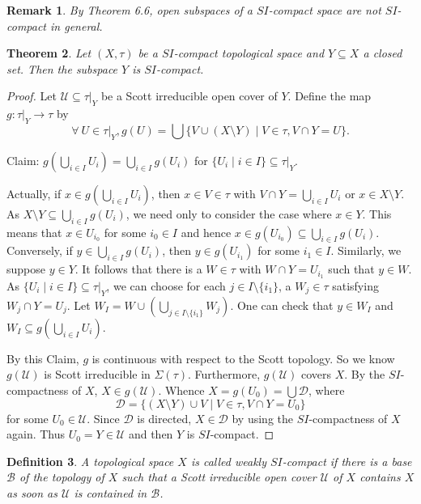 \documentclass[preprint,12pt]{elsarticle}
\numberwithin{equation}{section}
\newtheorem{theorem}{Theorem}[section]
\newtheorem{definition}[theorem]{Definition}
\newtheorem{remark}[theorem]{Remark}
\begin{document}
\begin{remark}{\rm By Theorem 6.6,  open subspaces of a $SI$-compact space are not $SI$-compact in general.}
\end{remark}

\begin{theorem} Let $(X,\tau)$ be a $SI$-compact topological space and $Y\subseteq X$ a closed set. Then the subspace $Y$ is $SI$-compact.
\end{theorem}
\begin{proof}Let $\mathcal{U}\subseteq \tau|_{Y}$ be a Scott irreducible open cover of $Y$. Define the map $g:\tau|_{Y}\longrightarrow \tau$ by $$\forall\ U\in\tau|_{Y}, g(U)=\bigcup\{V\cup (X\setminus Y)\mid V\in\tau, V\cap Y=U\}.$$

Claim: $g(\bigcup\limits_{i\in I}U_{i})=\bigcup\limits_{i\in I}g(U_{i})$ for $\{U_{i}\mid i\in I\}\subseteq\tau|_{Y}$.

 Actually, if $x\in g(\bigcup\limits_{i\in I}U_{i})$, then $x\in V\in\tau$ with $V\cap Y=\bigcup\limits_{i\in I}U_{i}$ or $x\in X\setminus Y$. As $X\setminus Y\subseteq\bigcup\limits_{i\in I}g(U_{i})$, we need only to consider the case where $x\in Y$. This means that $x\in U_{i_{0}}$ for some $i_{0}\in I$ and hence $x\in g(U_{i_{0}})\subseteq\bigcup\limits_{i\in I}g(U_{i})$. Conversely, if $y\in\bigcup\limits_{i\in I}g(U_{i})$, then $y\in g(U_{i_{1}})$ for some $i_{1}\in I$. Similarly, we suppose $y\in Y$. It follows that there is a $W\in\tau$ with $W\cap Y=U_{i_{1}}$ such that $y\in W$. As $\{U_{i}\mid i\in I\}\subseteq\tau|_{Y}$, we can choose for each $j\in I\setminus\{i_{1}\}$, a $W_{j}\in \tau$ satisfying $W_{j}\cap Y=U_{j}$. Let $W_{I}=W\cup(\bigcup\limits_{j\in I\setminus\{i_{1}\}}W_{j})$.
 One can check that $y\in W_{I}$ and $W_{I}\subseteq g(\bigcup\limits_{i\in I}U_{i})$.

 By this Claim, $g$ is continuous with respect to the Scott topology. So we know $g(\mathcal{U})$ is Scott irreducible in $\Sigma (\tau)$. Furthermore, $g(\mathcal{U})$ covers $X$. By the $SI$-compactness of $X$, $X\in g(\mathcal{U})$. Whence $X=g(U_{0})=\bigcup\mathcal{D}$, where $$\mathcal{D}=\{(X\setminus Y)\cup V\mid V\in\tau ,V\cap Y=U_{0}\}$$ for some $U_{0}\in\mathcal{U}$. Since $\mathcal{D}$ is directed, $X\in\mathcal{D}$ by using the $SI$-compactness of $X$ again. Thus $U_{0}=Y\in\mathcal{U}$ and then $Y$ is $SI$-compact.\end{proof}

\begin{definition} A topological space $X$ is called weakly $SI$-compact if there is a base $\mathcal{B}$ of the topology of $X$ such that a Scott irreducible open cover $\mathcal{U}$ of $X$ contains $X$ as soon as $\mathcal{U}$ is contained in $\mathcal{B}$.
\end{definition}
\end{document}
